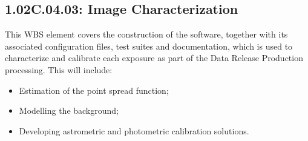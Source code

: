 \subsection{1.02C.04.03: Image Characterization}

This WBS element covers the construction of the software, together with
its associated configuration files, test suites and documentation, which
is used to characterize and calibrate each exposure as part of the Data
Release Production processing. This will include:

\begin{itemize}

\item{Estimation of the point spread function;}
\item{Modelling the background;}
\item{Developing astrometric and photometric calibration solutions.}

\end{itemize}
